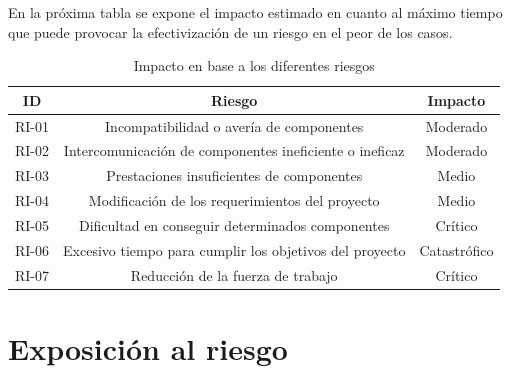 En la próxima tabla se expone el impacto estimado en cuanto al máximo tiempo que puede provocar la efectivización de un riesgo en el peor de los casos.
\begin{table}[H]
\centering
\begin{tabular}{|c|c|c|}
    \hline \rowcolor{test_header_color}
        ID & Riesgo & Impacto \\
    \hline
        RI-01 & Incompatibilidad o avería de componentes & Moderado \cellcolor{green!65} \\
    \hline
        RI-02 & Intercomunicación de componentes ineficiente o ineficaz & Moderado \cellcolor{yellow!65} \\
    \hline
        RI-03 & Prestaciones insuficientes de componentes & Medio \cellcolor{yellow!65} \\
    \hline
        RI-04 & Modificación de los requerimientos del proyecto & Medio \cellcolor{orange!65} \\
    \hline
        RI-05 & Dificultad en conseguir determinados componentes & Crítico \cellcolor{orange!65} \\
    \hline
        RI-06 & Excesivo tiempo para cumplir los objetivos del proyecto & Catastrófico \cellcolor{red!65} \\
    \hline
        RI-07 & Reducción de la fuerza de trabajo & Crítico \cellcolor{orange!65} \\
    \hline
\end{tabular}
\caption{Impacto en base a los diferentes riesgos}
\end{table}

\newpage
\section{Exposición al riesgo}

